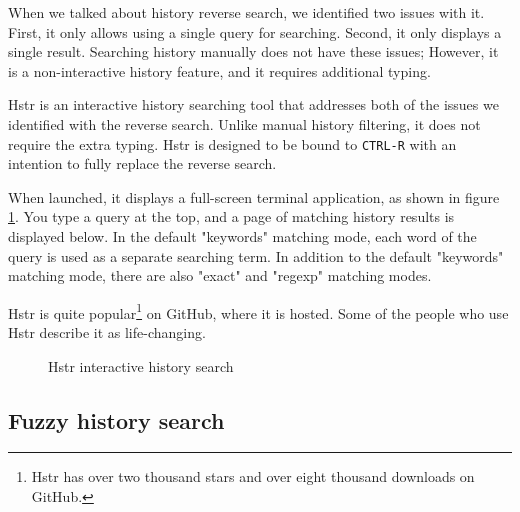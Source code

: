 When we talked about history reverse search, we identified two issues with it. First, it only allows using a single query for searching. Second, it only displays a single result.
Searching history manually does not have these issues; However, it is a non-interactive history feature, and it requires additional typing. 

Hstr\cite{toolshstr} is an interactive history searching tool that addresses both of the issues we identified with the reverse search. Unlike manual history filtering, it does not require the extra typing. Hstr is designed to be bound to \verb|CTRL-R| with an intention to fully replace the reverse search.

When launched, it displays a full-screen terminal application, as shown in figure \ref{hstr-screenshot}. You type a query at the top, and a page of matching history results is displayed below. In the default "keywords" matching mode, each word of the query is used as a separate searching term. 
In addition to the default "keywords" matching mode, there are also "exact" and "regexp" matching modes. 

Hstr is quite popular\footnote{Hstr has over two thousand stars and over eight thousand downloads on GitHub.} on GitHub, where it is hosted. Some of the people who use Hstr describe it as life-changing.

\begin{figure}
  \caption{Hstr interactive history search}
  \label{hstr-screenshot}
\end{figure}


\subsection{Fuzzy history search}

